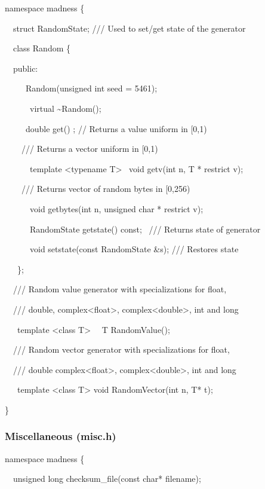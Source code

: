 \documentclass[letterpaper]{article}
\begin{document}
{\ttfamily
namespace madness \{}

{\ttfamily
\ \ struct RandomState; /// Used to set/get state of the generator}

{\ttfamily
\ \ class Random \{}

{\ttfamily
\ \ public:}

{\ttfamily
\ \ \ \ \ Random(unsigned int seed = 5461);}

{\ttfamily
\ \ \ \ \ \ virtual \~{}Random();}

{\ttfamily
\ \ \ \ \ double get() ; // Returns a value uniform in [0,1)}

{\ttfamily
\ \ \ \ /// Returns a vector uniform in [0,1)}

{\ttfamily
\ \ \ \ \ \ template {\textless}typename T{\textgreater} \ void getv(int n, T * restrict v); }

{\ttfamily
\ \ \ \ /// Returns vector of random bytes in [0,256)}

{\ttfamily
\ \ \ \ \ \ void getbytes(int n, unsigned char * restrict v); }

{\ttfamily
\ \ \ \ \ \ RandomState getstate() const; \ /// Returns state of generator}

{\ttfamily
\ \ \ \ \ \ void setstate(const RandomState \&s); /// Restores state}

{\ttfamily
\ \ \ \};}

{\ttfamily
\ \ /// Random value generator with specializations for float,}

{\ttfamily
\ \ /// double, complex{\textless}float{\textgreater}, complex{\textless}double{\textgreater}, int and long}

{\ttfamily
\ \ \ template {\textless}class T{\textgreater} \ \ T RandomValue();}

{\ttfamily
\ \ /// Random vector generator with specializations for float,}

{\ttfamily
\ \ /// double complex{\textless}float{\textgreater}, complex{\textless}double{\textgreater}, int and long}

{\ttfamily
\ \ \ template {\textless}class T{\textgreater} void RandomVector(int n, T* t);}

{\ttfamily
\}}

\subsubsection{Miscellaneous (misc.h)}
{\ttfamily
namespace madness \{}

{\ttfamily
\ \ unsigned long checksum\_file(const char* filename);}
\end{document}
